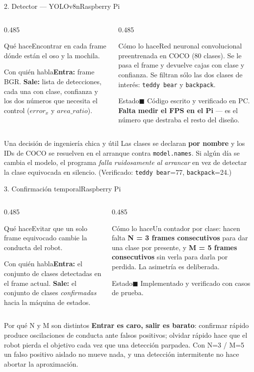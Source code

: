 \documentclass[aspectratio=169,10pt]{beamer}
\newcommand{\listo}{\textcolor{verde}{$\blacksquare$}}
\newcommand{\curso}{\textcolor{ambar}{$\blacksquare$}}
\newcommand{\ficha}[4]{%
  {\footnotesize
  \begin{columns}[T,onlytextwidth]
    \begin{column}{0.485\textwidth}
      \begin{block}{Qué hace}#1\end{block}
      \begin{block}{Con quién habla}#3\end{block}
    \end{column}
    \begin{column}{0.485\textwidth}
      \begin{block}{Cómo lo hace}#2\end{block}
      \begin{block}{Estado}#4\end{block}
    \end{column}
  \end{columns}}}
\begin{document}
\begin{frame}{2. Detector --- YOLOv8n\hfill{\small\mdseries Raspberry Pi}}
  \ficha
  {Encontrar en cada frame dónde están el oso y la mochila.}
  {Red neuronal convolucional preentrenada en COCO (80 clases). Se le pasa el
   frame y devuelve cajas con clase y confianza. Se filtran sólo las dos clases
   de interés: \texttt{teddy bear} y \texttt{backpack}.}
  {\textbf{Entra:} frame BGR. \textbf{Sale:} lista de detecciones, cada una con
   clase, confianza y los dos números que necesita el control ($error_x$ y
   $area\_ratio$).}
  {\curso{} Código escrito y verificado en PC. \textbf{Falta medir el FPS en el Pi}
   --- es el número que destraba el resto del diseño.}

  \vspace{0.4em}
  \small
  \begin{block}{Una decisión de ingeniería chica y útil}
    Las clases se declaran \textbf{por nombre} y los IDs de COCO se resuelven
    en el arranque contra \texttt{model.names}. Si algún día se cambia el modelo,
    el programa \emph{falla ruidosamente al arrancar} en vez de detectar la clase
    equivocada en silencio. (Verificado: \texttt{teddy bear}=77, \texttt{backpack}=24.)
  \end{block}
\end{frame}

\begin{frame}{3. Confirmación temporal\hfill{\small\mdseries Raspberry Pi}}
  \ficha
  {Evitar que un solo frame equivocado cambie la conducta del robot.}
  {Un contador por clase: hacen falta \textbf{N = 3 frames consecutivos} para
   dar una clase por presente, y \textbf{M = 5 frames consecutivos} sin verla
   para darla por perdida. La asimetría es deliberada.}
  {\textbf{Entra:} el conjunto de clases detectadas en el frame actual.
   \textbf{Sale:} el conjunto de clases \emph{confirmadas} hacia la máquina de
   estados.}
  {\listo{} Implementado y verificado con casos de prueba.}

  \vspace{0.4em}
  \small
  \begin{alertblock}{Por qué N y M son distintos}
    \textbf{Entrar es caro, salir es barato}: confirmar rápido produce
    oscilaciones de conducta ante falsos positivos; olvidar rápido hace que el
    robot pierda el objetivo cada vez que una detección parpadea. Con N=3 / M=5
    un falso positivo aislado no mueve nada, y una detección intermitente no
    hace abortar la aproximación.
  \end{alertblock}
\end{frame}
\end{document}
